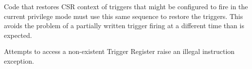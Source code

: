 Code that restores CSR context of triggers that might be configured to fire in
the current privilege mode must use this same sequence to restore the triggers.
This avoids the problem of a partially written trigger firing at a different
time than is expected.

Attempts to access a non-existent Trigger Register raise an illegal instruction
exception.


